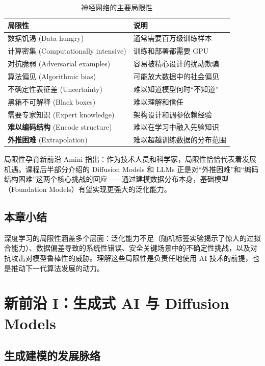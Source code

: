 \documentclass[a4paper]{article}
\begin{document}
\begin{table}[H]
\centering
\begin{tabular}{ll}
\toprule
\textbf{局限性} & \textbf{说明} \\
\midrule
数据饥渴 (Data hungry) & 通常需要百万级训练样本 \\
计算密集 (Computationally intensive) & 训练和部署都需要 GPU \\
对抗脆弱 (Adversarial examples) & 容易被精心设计的扰动欺骗 \\
算法偏见 (Algorithmic bias) & 可能放大数据中的社会偏见 \\
不确定性表征差 (Uncertainty) & 难以知道模型何时``不知道'' \\
黑箱不可解释 (Black boxes) & 难以理解和信任 \\
需要专家知识 (Expert knowledge) & 架构设计和调参依赖经验 \\
\textbf{难以编码结构} (Encode structure) & 难以在学习中融入先验知识 \\
\textbf{外推困难} (Extrapolation) & 难以超越训练数据的分布范围 \\
\bottomrule
\end{tabular}
\caption{神经网络的主要局限性}
\end{table}

\begin{knowledgebox}{局限性孕育新前沿}
Amini 指出：作为技术人员和科学家，局限性恰恰代表着发展机遇。课程后半部分介绍的 Diffusion Models 和 LLMs 正是对``外推困难''和``编码结构困难''这两个核心挑战的回应——通过建模数据分布本身，基础模型（Foundation Models）有望实现更强大的泛化能力。
\end{knowledgebox}

\subsection{本章小结}

深度学习的局限性涵盖多个层面：泛化能力不足（随机标签实验揭示了惊人的过拟合能力）、数据偏差导致的系统性错误、安全关键场景中的不确定性挑战，以及对抗攻击对模型鲁棒性的威胁。理解这些局限性是负责任地使用 AI 技术的前提，也是推动下一代算法发展的动力。

\section{新前沿 I：生成式 AI 与 Diffusion Models}

\subsection{生成建模的发展脉络}
\end{document}
